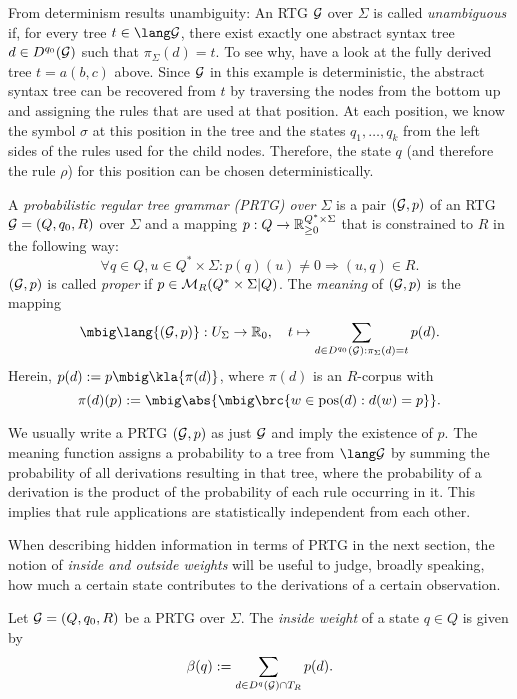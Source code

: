From determinism results unambiguity: An RTG $\mathcal G$ over $\Sigma$ is called
\emph{unambiguous} if, for every tree $t\in\lang\ug$, there exist exactly one
abstract syntax tree $d\in D^{q_0}(\mathcal G)$ such that $\pi_\Sigma(d) = t$. To see why, have
a look at the fully derived tree $t = a(b,c)$ above. Since $\mathcal G$ in this
example is deterministic, the abstract syntax tree can be recovered from $t$ by
traversing the nodes from the bottom up and assigning the rules that are used
at that position. At each position, we know the symbol $\sigma$ at this
position in the tree and the states $q_1,\ldots,q_k$ from the left sides of the
rules used for the child nodes. Therefore, the state $q$ (and therefore the
rule $\rho$) for this position can be chosen deterministically.

\begin{definition}
 A \emph{probabilistic regular tree grammar (PRTG) over $\Sigma$} is a pair
 $(\mathcal G,p)$ of an RTG $\mathcal G=(Q,q_0,R)$ over $\Sigma$ and a mapping
 $p:Q\to\mathbb R_{\geq0}^{Q^*\times\Sigma}$ that is constrained to $R$ in the
 following way:
 \[
  \forall q\in Q, u\in Q^*\times\Sigma: p(q)(u) \neq 0 \Rightarrow (u,q) \in R.
 \]
 $(\mathcal G,p)$ is called \emph{proper} if $p\in\mathcal M_R(Q^*\times\Sigma|Q)$. The
 \emph{meaning} of $(\mathcal G,p)$ is the mapping
 \[
  \mbig\lang{(\ug,p)}: U_\Sigma \to \zr_0, \quad
  t \mapsto \sum_{d\in D^{q_0}(\ug): \pi_\Sigma(d)=t} p(d).
 \]
 Herein, $p(d) := p\mbig\kla{\pi(d)}$, where $\pi(d)$ is an $R$-corpus with
 \[
  \pi(d)(p) := \mbig\abs{\mbig\brc{w\in\pos(d): d(w)=p}}.
 \]
\end{definition}

We usually write a PRTG $(\mathcal G,p)$ as just $\mathcal G$ and imply the existence of $p$.
The meaning function assigns a probability to a tree from $\lang\ug$ by summing
the probability of all derivations resulting in that tree, where the
probability of a derivation is the product of the probability of each rule
occurring in it. This implies that rule applications are statistically
independent from each other.

When describing hidden information in terms of PRTG in the next section, the
notion of \emph{inside and outside weights} will be useful to judge, broadly
speaking, how much a certain state contributes to the derivations of a certain
observation.

\begin{definition}
 Let $\mathcal G = (Q,q_0,R)$ be a PRTG over $\Sigma$. The \emph{inside weight} of a
 state $q\in Q$ is given by
 \[
  \beta(q) := \sum_{d\in D^q(\mathcal G)\cap T_R} p(d).
 \]
\end{definition}

